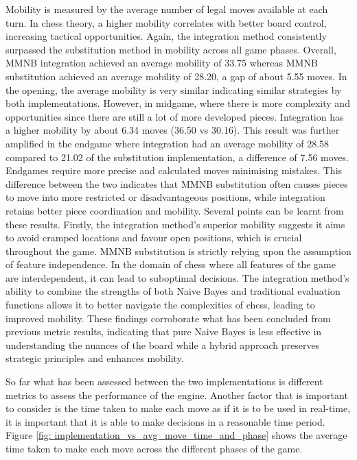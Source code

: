 

Mobility is measured by the average number of legal moves available at each turn. In chess theory, a higher mobility correlates with better board control, increasing tactical opportunities. Again, the integration method consistently surpassed the substitution method in mobility across all game phases. 
Overall, MMNB integration achieved an average mobility of 33.75 whereas MMNB substitution achieved an average mobility of 28.20, a gap of about 5.55 moves. In the opening, the average mobility is very similar indicating similar strategies by both implementations. However, in midgame, where there is more complexity and opportunities since there are still a lot of more developed pieces. Integration has a higher mobility by about 6.34 moves (36.50 vs 30.16). This result was further amplified in the endgame where integration had an average mobility of 28.58 compared to 21.02 of the substitution implementation, a difference of 7.56 moves. Endgames require more precise and calculated moves minimising mistakes. This difference between the two indicates that MMNB substitution often causes pieces to move into more restricted or disadvantageous positions, while integration retains better piece coordination and mobility. Several points can be learnt from these results. Firstly, the integration method's superior mobility suggests it aims to avoid cramped locations and favour open positions, which is crucial throughout the game. MMNB substitution is strictly relying upon the assumption of feature independence. In the domain of chess where all features of the game are interdependent, it can lead to suboptimal decisions. The integration method's ability to combine the strengths of both Naive Bayes and traditional evaluation functions allows it to better navigate the complexities of chess, leading to improved mobility. These findings corroborate what has been concluded from previous metric results, indicating that pure Naive Bayes is less effective in understanding the nuances of the board while a hybrid approach preserves strategic principles and enhances mobility.

So far what has been assessed between the two implementations is different metrics to assess the performance of the engine. Another factor that is important to consider is the time taken to make each move as if it is to be used in real-time, it is important that it is able to make decisions in a reasonable time period. Figure \ref{fig: implementation_vs_avg_move_time_and_phase} shows the average time taken to make each move across the different phases of the game.

